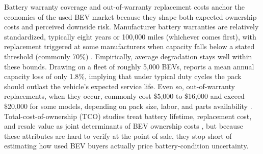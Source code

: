 \documentclass[a4paper,fleqn]{cas-sc}   %
\begin{document}
Battery warranty coverage and out-of-warranty replacement costs anchor the economics of the used BEV market because they shape both expected ownership costs and perceived downside risk. Manufacturer battery warranties are relatively standardized, typically eight years or 100,000 miles (whichever comes first), with replacement triggered at some manufacturers when capacity falls below a stated threshold (commonly 70\%) \parencite{clarkeCarWarrantyCoverage2024}. Empirically, average degradation stays well within these bounds. Drawing on a fleet of roughly 5,000 BEVs, \textcite{dnistranEVBatteriesCan2024} reports a mean annual capacity loss of only 1.8\%, implying that under typical duty cycles the pack should outlast the vehicle's expected service life. Even so, out-of-warranty replacements, when they occur, commonly cost \$5,000 to \$16,000 and exceed \$20,000 for some models, depending on pack size, labor, and parts availability \parencite{kothariBatteryReplacementCosts2024, wittElectricCarBattery2024}. Total-cost-of-ownership (TCO) studies treat battery lifetime, replacement cost, and resale value as  joint determinants of BEV ownership costs \parencite{hagmanTotalCostOwnership2016, letmatheConsumerorientedTotalCost2017}, but because these attributes are hard to verify at the point of sale, they stop short of estimating how used BEV buyers actually price battery-condition uncertainty.
\end{document}

